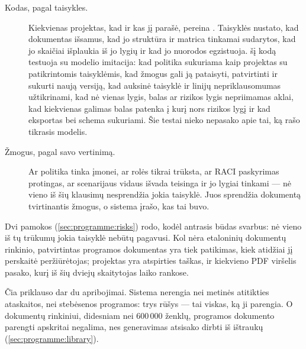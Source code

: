 \begin{description}
  \item[Kodas, pagal taisykles.] Kiekvienas projektas, kad ir kas jį parašė, pereina
    . Taisyklės nustato, kad dokumentas išsamus, kad jo struktūra ir matrica
    tinkamai sudarytos, kad jo skaičiai išplaukia iš jo lygių ir kad jo nuorodos egzistuoja.
     šį kodą testuoja su modelio imitacija: kad politika
    sukuriama kaip projektas su patikrintomis taisyklėmis, kad žmogus gali ją pataisyti,
    patvirtinti ir sukurti naują versiją, kad auksinė taisyklė ir linijų nepriklausomumas
    užtikrinami, kad nė vienas lygis, balas ar rizikos lygis nepriimamas aklai, kad kiekvienas
    galimas balas patenka į kurį nors rizikos lygį ir kad eksportas bei schema sukuriami. Šie
    testai nieko nepasako apie tai, ką rašo tikrasis modelis.
  \item[Žmogus, pagal savo vertinimą.] Ar politika tinka įmonei, ar rolės tikrai trūksta, ar
    RACI paskyrimas protingas, ar scenarijaus vidaus išvada teisinga ir jo lygiai tinkami ---
    nė vieno iš šių klausimų nesprendžia jokia taisyklė. Juos sprendžia dokumentą tvirtinantis
    žmogus, o sistema įrašo, kas tai buvo.
\end{description}

Dvi pamokos (\cref{sec:programme:risks}) rodo, kodėl antrasis būdas svarbus: nė vieno iš tų
trūkumų jokia taisyklė nebūtų pagavusi. Kol nėra etaloninių dokumentų rinkinio, patvirtintas
programos dokumentas yra tiek patikimas, kiek atidžiai jį perskaitė peržiūrėtojas; projektas
yra atspirties taškas, ir kiekvieno PDF viršelis pasako, kurį iš šių dviejų skaitytojas laiko
rankose.

Čia priklauso dar du apribojimai. Sistema nerengia nei metinės atitikties ataskaitos, nei
stebėsenos programos: trys rūšys --- tai viskas, ką ji parengia. O dokumentų rinkiniui,
didesniam nei 600\,000 ženklų, programos dokumento parengti apskritai negalima, nes generavimas
atsisako dirbti iš ištraukų (\cref{sec:programme:library}).
